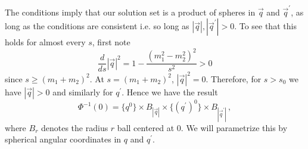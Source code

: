 The conditions  imply that our solution set is a product of spheres in $\vec{q}$ and $\vec{q}^{\prime}$, as long as the conditions are consistent i.e. so long as $|\vec{q}|,|\vec{q}^{\prime}|>0$. To see that this holds for almost every $s$, first note
\begin{equation}
\frac{d}{ds}|\vec{q}|^2=1-\frac{(m_1^2-m_2^2)^2}{s^2}>0
\end{equation}
since $s\geq (m_1+m_2)^2$.  At $s=(m_1+m_2)^2$, $|\vec{q}|^2=0$.  Therefore, for $s>s_0$ we have $|\vec{q}|>0$ and similarly for $q^{\prime}$.  Hence we have the result
\begin{equation}
\Phi^{-1}(0)=\{q^{0}\}\times B_{|\vec{q}|}\times \{(q^{\prime})^{0}\}\times B_{|\vec{q}^{\prime}|}\,,
\end{equation}
where $B_r$ denotes the radius $r$ ball centered at $0$.  We will parametrize this by spherical angular coordinates in $q$ and $q^{\prime}$. 

